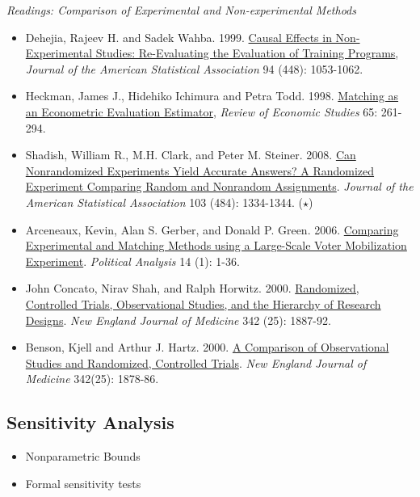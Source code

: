 \documentclass{article}
\begin{document}
\emph{Readings: Comparison of Experimental and Non-experimental Methods}
\begin{itemize}
\item Dehejia, Rajeev H. and Sadek Wahba. 1999.  \href{http://www.jstor.org/stable/2669919} {Causal Effects in Non-Experimental Studies: Re-Evaluating the Evaluation of Training Programs}, \textit{Journal of the American Statistical Association} 94 (448): 1053-1062.
\item Heckman, James J., Hidehiko Ichimura and Petra Todd. 1998.  \href{http://www.jstor.org/stable/2566973} {Matching as an Econometric
Evaluation Estimator}, \textit{Review
of Economic Studies} 65: 261-294.
\item Shadish, William R., M.H. Clark, and Peter M. Steiner. 2008.  \href{http://stat-athens.aueb.gr/~jpan/Shadish-JASA2008(1334-1356)-17mr09.pdf} {Can Nonrandomized Experiments Yield Accurate Answers? A Randomized Experiment Comparing Random and Nonrandom Assignments}. \textit{Journal of the American Statistical Association} 103 (484): 1334-1344. ($\star$)
\item Arceneaux, Kevin, Alan S. Gerber, and Donald P. Green. 2006.  \href{http://pan.oxfordjournals.org/cgi/content/abstract/14/1/37} {Comparing Experimental and Matching Methods using a Large-Scale Voter Mobilization Experiment}. \textit{Political Analysis} 14 (1): 1-36.
\item John Concato, Nirav Shah, and Ralph Horwitz. 2000.  \href{http://www.ncbi.nlm.nih.gov/pmc/articles/PMC1557642/} {Randomized, Controlled Trials, Observational Studies, and the Hierarchy of Research Designs}.
\textit{New England Journal of Medicine} 342 (25): 1887-92.
\item Benson, Kjell and Arthur J. Hartz. 2000.  \href{http://www.nejm.org/doi/full/10.1056/NEJM200006223422506} {A Comparison of Observational Studies and Randomized, Controlled Trials}. \textit{New England Journal of Medicine} 342(25): 1878-86.
\end{itemize}




\subsection{Sensitivity Analysis}

\begin{itemize}
\item Nonparametric Bounds
\item Formal sensitivity tests
\end{itemize}
\end{document}
